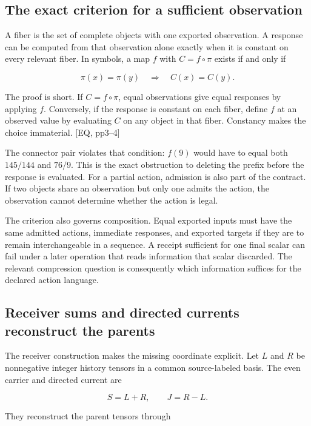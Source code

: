 \subsection{The exact criterion for a sufficient observation}\label{the-exact-criterion-for-a-sufficient-observation}

A fiber is the set of complete objects with one exported observation. A response can be computed from that observation alone exactly when it is constant on every relevant fiber. In symbols, a map \(f\) with \(C=f\circ\pi\) exists if and only if

\[
\pi(x)=\pi(y)\quad\Longrightarrow\quad C(x)=C(y).
\]

The proof is short. If \(C=f\circ\pi\), equal observations give equal responses by applying \(f\). Conversely, if the response is constant on each fiber, define \(f\) at an observed value by evaluating \(C\) on any object in that fiber. Constancy makes the choice immaterial. {[}EQ, pp3--4{]}

The connector pair violates that condition: \(f(9)\) would have to equal both \(145/144\) and \(76/9\). This is the exact obstruction to deleting the prefix before the response is evaluated. For a partial action, admission is also part of the contract. If two objects share an observation but only one admits the action, the observation cannot determine whether the action is legal.

The criterion also governs composition. Equal exported inputs must have the same admitted actions, immediate responses, and exported targets if they are to remain interchangeable in a sequence. A receipt sufficient for one final scalar can fail under a later operation that reads information that scalar discarded. The relevant compression question is consequently which information suffices for the declared action language.

\subsection{Receiver sums and directed currents reconstruct the parents}\label{receiver-sums-and-directed-currents-reconstruct-the-parents}

The receiver construction makes the missing coordinate explicit. Let \(L\) and \(R\) be nonnegative integer history tensors in a common source-labeled basis. The even carrier and directed current are

\[
S=L+R,\qquad J=R-L.
\]

They reconstruct the parent tensors through

